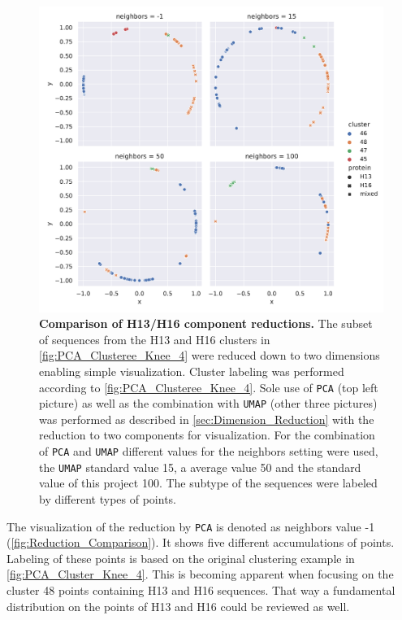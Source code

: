\begin{figure}[!hbt]
    \centering
    \includegraphics[width=\textwidth]{PCA/Difference_Segment_4_H_metric_cosine.pdf}
    \caption[Comparison of H13/H16 component reductions]{\textbf{Comparison of H13/H16 component reductions.} The subset of sequences from the H13 and H16 clusters in \autoref{fig:PCA_Clusteree_Knee_4} were reduced down to two dimensions enabling simple visualization. Cluster labeling was performed according to \autoref{fig:PCA_Clusteree_Knee_4}. Sole use of \texttt{PCA} (top left picture) as well as the combination with \texttt{UMAP} (other three pictures) was performed as described in \autoref{sec:Dimension_Reduction} with the reduction to two components for visualization. For the combination of \texttt{PCA} and \texttt{UMAP} different values for the neighbors setting were used, the \texttt{UMAP} standard value 15, a average value 50 and the standard value of this project 100. The subtype of the sequences were labeled by different types of points.}
    \label{fig:Reduction_Comparison}
\end{figure}

\vspace{1em}

The visualization of the reduction by \texttt{PCA} is denoted as neighbors value -1 (\autoref{fig:Reduction_Comparison}). It shows five different accumulations of points. Labeling of these points is based on the original clustering example in \autoref{fig:PCA_Cluster_Knee_4}. This is becoming apparent when focusing on the cluster 48 points containing H13 and H16 sequences. That way a fundamental distribution on the points of H13 and H16 could be reviewed as well. 

